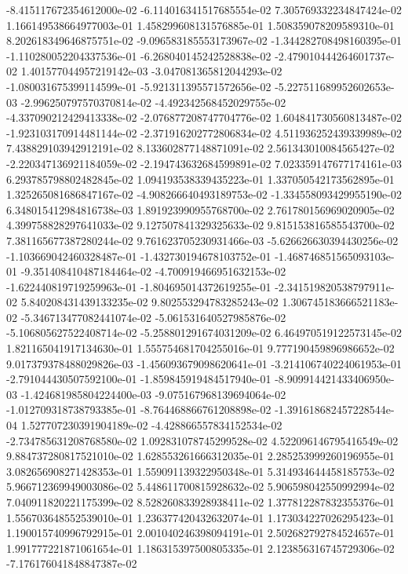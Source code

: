 -8.415117672354612000e-02
-6.114016341517685554e-02
7.305769332234847424e-02
1.166149538664977003e-01
1.458299608131576885e-01
1.508359078209589310e-01
8.202618349646875751e-02
-9.096583185553173967e-02
-1.344282708498160395e-01
-1.110280052204337536e-01
-6.268040145242528838e-02
-2.479010444264601737e-02
1.401577044957219142e-03
-3.047081365812044293e-02
-1.080031675399114599e-01
-5.921311395571572656e-02
-5.227511689952602653e-03
-2.996250797570370814e-02
-4.492342568452029755e-02
-4.337090212429413338e-02
-2.076877208747704776e-02
1.604841730560813487e-02
-1.923103170914481144e-02
-2.371916202772806834e-02
4.511936252439339989e-02
7.438829103942912191e-02
8.133602877148871091e-02
2.561343010084565427e-02
-2.220347136921184059e-02
-2.194743632684599891e-02
7.023359147677174161e-03
6.293785798802482845e-02
1.094193538339435223e-01
1.337050542173562895e-01
1.325265081686847167e-02
-4.908266640493189753e-02
-1.334558093429955190e-02
6.348015412984816738e-03
1.891923990955768700e-02
2.761780156969020905e-02
4.399758828297641033e-02
9.127507841329325633e-02
9.815153816585543700e-02
7.381165677387280244e-02
9.761623705230931466e-03
-5.626626630394430256e-02
-1.103669042460328487e-01
-1.432730194678103752e-01
-1.468746851565093103e-01
-9.351408410487184464e-02
-4.700919466951632153e-02
-1.622440819719259963e-01
-1.804695014372619255e-01
-2.341519820538797911e-02
5.840208431439133235e-02
9.802553294783285243e-02
1.306745183666521183e-02
-5.346713477082441074e-02
-5.061531640527985876e-02
-5.106805627522408714e-02
-5.258801291674031209e-02
6.464970519122573145e-02
1.821165041917134630e-01
1.555754681704255016e-01
9.777190459896986652e-02
9.017379378488029826e-03
-1.456093679098620641e-01
-3.214106740224061953e-01
-2.791044430507592100e-01
-1.859845919484517940e-01
-8.909914421433406950e-03
-1.424681985804224400e-03
-9.075167968139694064e-02
-1.012709318738793385e-01
-8.764468866761208898e-02
-1.391618682457228544e-04
1.527707230391904189e-02
-4.428866557834152534e-02
-2.734785631208768580e-02
1.092831078745299528e-02
4.522096146795416549e-02
9.884737280817521010e-02
1.628553261666312035e-01
2.285253999260196955e-01
3.082656908271428353e-01
1.559091139322950348e-01
5.314934644458185753e-02
5.966712369949003086e-02
5.448611700815928632e-02
5.906598042550992994e-02
7.040911820221175399e-02
8.528260833928938411e-02
1.377812287832355376e-01
1.556703648552539010e-01
1.236377420432632074e-01
1.173034227026295423e-01
1.190015740996792915e-01
2.001040246398094191e-01
2.502682792784524657e-01
1.991777221871061654e-01
1.186315397500805335e-01
2.123856316745729306e-02
-7.176176041848847387e-02
